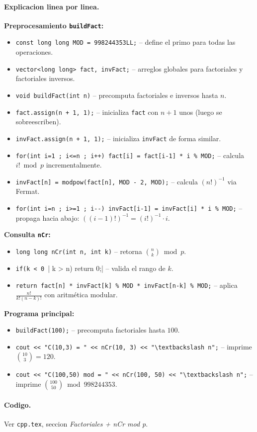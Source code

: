 \paragraph{Explicacion linea por linea.}
\textbf{Preprocesamiento \texttt{buildFact}:}
\begin{itemize}\setlength\itemsep{0pt}
	\item \verb|const long long MOD = 998244353LL;| -- define el primo para todas las operaciones.
	\item \verb|vector<long long> fact, invFact;| -- arreglos globales para factoriales y factoriales inversos.
	\item \verb|void buildFact(int n)| -- precomputa factoriales e inversos hasta $n$.
	\item \verb|fact.assign(n + 1, 1);| -- inicializa \texttt{fact} con $n+1$ unos (luego se sobreescriben).
	\item \verb|invFact.assign(n + 1, 1);| -- inicializa \texttt{invFact} de forma similar.
	\item \verb|for(int i=1 ; i<=n ; i++) fact[i] = fact[i-1] * i % MOD;| -- calcula $i! \bmod p$ incrementalmente.
	\item \verb|invFact[n] = modpow(fact[n], MOD - 2, MOD);| -- calcula $(n!)^{-1}$ via Fermat.
	\item \verb|for(int i=n ; i>=1 ; i--) invFact[i-1] = invFact[i] * i % MOD;| -- propaga hacia abajo: $((i-1)!)^{-1} = (i!)^{-1} \cdot i$.
\end{itemize}
\textbf{Consulta \texttt{nCr}:}
\begin{itemize}\setlength\itemsep{0pt}
	\item \verb|long long nCr(int n, int k)| -- retorna $\binom{n}{k} \bmod p$.
	\item \verb|if(k < 0 || k > n) return 0;| -- valida el rango de $k$.
	\item \verb|return fact[n] * invFact[k] % MOD * invFact[n-k] % MOD;| -- aplica $\frac{n!}{k!(n-k)!}$ con aritm\'etica modular.
\end{itemize}
\textbf{Programa principal:}
\begin{itemize}\setlength\itemsep{0pt}
	\item \verb|buildFact(100);| -- precomputa factoriales hasta $100$.
	\item \verb|cout << "C(10,3) = " << nCr(10, 3) << "\textbackslash n";| -- imprime $\binom{10}{3} = 120$.
	\item \verb|cout << "C(100,50) mod = " << nCr(100, 50) << "\textbackslash n";| -- imprime $\binom{100}{50} \bmod 998244353$.
\end{itemize}

\paragraph{Codigo.}
Ver \texttt{cpp.tex}, seccion \textit{Factoriales + nCr mod p}.

\vspace{0.5em|||}
